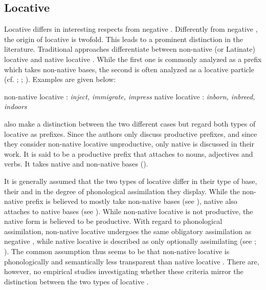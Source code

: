 \subsection{Locative } \label{locative in}

Locative  differs in interesting respects from negative . Differently from negative , the origin of locative  is twofold. This leads to a prominent distinction in the literature. Traditional approaches differentiate between non-native (or Latinate) locative  and native locative .  While the first one is commonly analyzed as a prefix which takes non-native bases, the second is often analyzed as a locative particle (cf. \citealt[497ff.]{Jespersen.1965}\mbox{;} \citealt[115, 163f.]{Marchand.1969}\mbox{;} \citealt[1685]{Bauer.2002}). Examples are given below:

\begin{exe}
	\ex non-native locative : \hspace{0.7cm} \textit{inject, immigrate, impress}
	\ex native locative : \hspace{1.4cm} \textit{inborn, inbreed, indoors}
\end{exe}

\cite{Bauer.2013} also make a distinction between the two different cases but regard both types of locative  as prefixes. Since the authors only discuss productive prefixes, and since they consider non-native locative  unproductive,  only native  is discussed in their work. It is said to be a productive prefix that attaches to nouns, adjectives and verbs. It takes native and non-native bases (\citealt[334, 340]{Bauer.2013}).
 
 It is generally assumed that the two types of locative  differ in their type of base, their  and in the degree of phonological assimilation they display. While the non-native prefix is believed to mostly take non-native bases (see \citealt[499]{Jespersen.1965}), native  also attaches to native bases (see \citealt[334]{Bauer.2013}). While non-native locative  is not productive, the native form is believed to be productive. With regard to phonological assimilation, non-native locative  undergoes the same obligatory assimilation as negative , while native locative  is described as only optionally assimilating (see \citealt[499]{Jespersen.1965}; \citealt[335]{Bauer.2013}). The common assumption thus seems to be that non-native locative  is phonologically and semantically less transparent than native locative . There are, however, no empirical studies investigating whether these criteria mirror the distinction between the two types of locative . 
 

